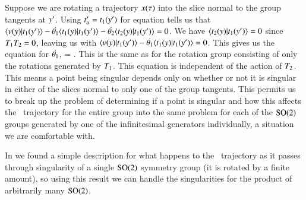 Suppose we are rotating a trajectory $x(\tau)$ into the slice normal
to the group tangents at ${y'}$. Using
$t'_{a}=t_1({y'})$ for equation
 tells us that
$\braket{\vel(\sspRed)}{\groupTan_1(\slicep)}-\dot{\gSpace_1} \braket{
\groupTan_1(\sspRed)}{\groupTan_1(\slicep)}-\dot{\gSpace_2} \braket{
\groupTan_2(\sspRed)}{\groupTan_1(\slicep)}=0$.
We have $\braket{\groupTan_2(\sspRed)}{\groupTan_1(\slicep)}=0$ since
$T_1 T_2=0$, leaving us with
$\braket{\vel(\sspRed)}{\groupTan_1(\slicep)}
-\dot{\gSpace_1}\braket{\groupTan_1(\sspRed)}{\groupTan_1(\slicep)}=0$.
This gives us the equation for $\dot{{\bf \theta}_1}$,
\beq
{}=
                     {}.
\eeq
This is the same as  for the rotation group
consisting of only the rotations generated by $T_1$. This equation is
independent of the action of $T_2$. This means a point being singular
depends only on whether or not it is singular in either of the slices
normal to only one of the group tangents. This permits us to break up the
problem of determining if a point is singular and how this affects the
\reducedsp\ trajectory for the entire group into the same problem for
each of the $\textrm{SO}(2)$ groups generated by one of the infinitesimal
generators individually, a situation we are comfortable with.

In  we found a simple
description for what happens to the \reducedsp\ trajectory as it passes
through singularity of a single $\textrm{SO}(2)$ symmetry group (it is rotated
by a finite amount), so using this result we can handle the singularities
for the product of arbitrarily many $\textrm{SO}(2)$.

%
